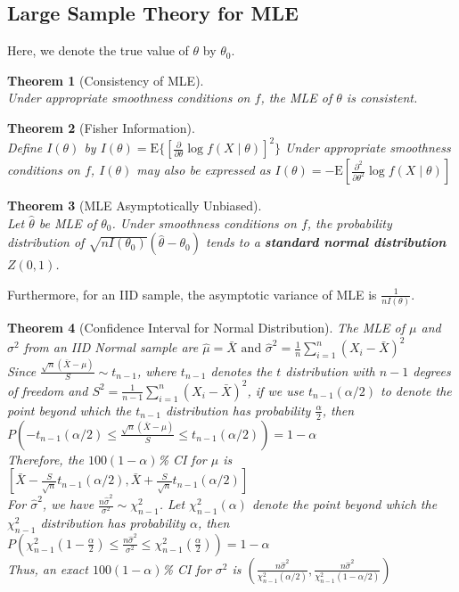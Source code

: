 \documentclass[12pt]{article}
\newcommand{\expec}{\mathrm{E}}
\newtheorem{theorem}{Theorem}[section]
\theoremstyle{definition}
\begin{document}
\subsection{Large Sample Theory for MLE}
Here, we denote the true value of $\theta$ by $\theta_0$.
\begin{theorem}[Consistency of MLE]
\hfill\\\normalfont Under appropriate smoothness conditions on $f$, the MLE of $\theta$ is consistent.
\end{theorem}
\begin{theorem}[Fisher Information]
\hfill\\\normalfont Define $I(\theta)$ by
$
I(\theta) = \expec\{[\frac{\partial}{\partial \theta} \log f(X\mid \theta)]^2\}
$
Under appropriate smoothness conditions on $f$, $I(\theta)$ may also be expressed as
$
I(\theta) = -\expec[\frac{\partial^2}{\partial \theta^2}\log f(X\mid \theta)]
$
\end{theorem}
\begin{theorem}[MLE Asymptotically Unbiased]
\hfill\\\normalfont Let $\hat{\theta}$ be MLE of $\theta_0$. Under smoothness conditions on $f$, the probability distribution of 
$
\sqrt{nI(\theta_0)}(\hat{\theta}-\theta_0)
$
tends to a \textbf{standard normal distribution} $Z(0,1)$.
\end{theorem}
Furthermore, for an IID sample, the asymptotic variance of MLE is $\frac{1}{nI(\theta)}$.
\begin{theorem}[Confidence Interval for Normal Distribution]\normalfont 
The MLE of $\mu$ and $\sigma^2$ from an IID Normal sample are
$
\hat{\mu}=\bar{X}\text{  and  }\hat{\sigma}^2=\frac{1}{n}\sum_{i=1}^n (X_i-\bar{X})^2
$\\
Since $\frac{\sqrt{n}(\bar{X}-\mu)}{S}\sim t_{n-1}$, where $t_{n-1}$ denotes the $t$ distribution with $n-1$ degrees of freedom and $S^2=\frac{1}{n-1}\sum_{i=1}^n (X_i-\bar{X})^2$, if we use $t_{n-1}(\alpha/2)$ to denote the point beyond which the $t_{n-1}$ distribution has probability $\frac{\alpha}{2}$, then
$
P(-t_{n-1}(\alpha/2)\leq \frac{\sqrt{n}(\bar{X}-\mu)}{S}\leq t_{n-1}(\alpha/2))=1-\alpha
$\\
Therefore, the $100(1-\alpha)$\% CI for $\mu$ is
$
[\bar{X}-\frac{S}{\sqrt{n}}t_{n-1}(\alpha/2), \bar{X}+\frac{S}{\sqrt{n}}t_{n-1}(\alpha/2)]
$\\
For $\hat{\sigma}^2$, we have $\frac{n\hat{\sigma}^2}{\sigma^2}\sim \chi_{n-1}^2$. Let $\chi_{n-1}^2(\alpha)$ denote the point beyond which the $\chi_{n-1}^2$ distribution has probability $\alpha$, then
$
P(\chi_{n-1}^2(1-\frac{\alpha}{2})\leq \frac{n\hat{\sigma}^2}{\sigma^2} \leq \chi_{n-1}^2(\frac{\alpha}{2}))=1-\alpha
$\\
Thus, an exact $100(1-\alpha)$\% CI for $\sigma^2$ is
$
(\frac{n\hat{\sigma}^2}{\chi_{n-1}^2(\alpha/2)}, \frac{n\hat{\sigma}^2}{\chi_{n-1}^2(1-\alpha/2)})
$
\end{theorem}
\end{document}
